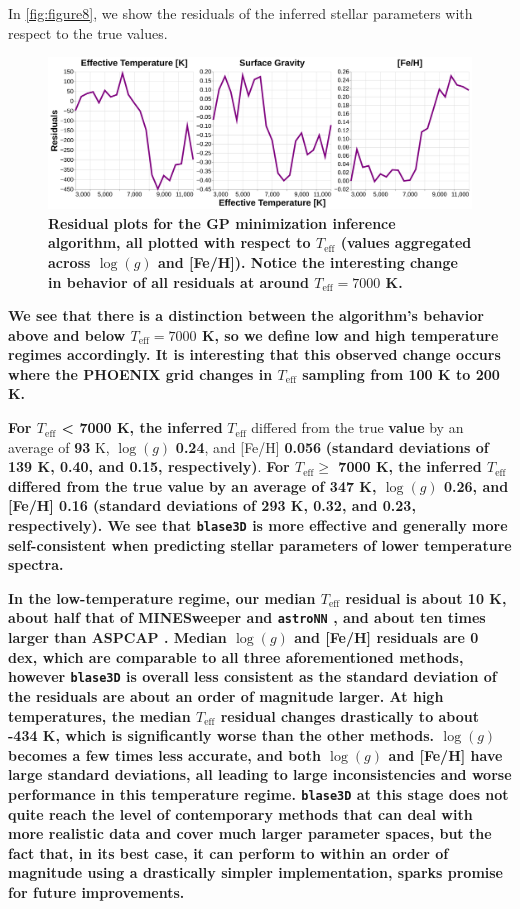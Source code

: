 \documentclass[twocolumn, linenumbers]{aastex631}
\begin{document}
In \autoref{fig:figure8}, we show the residuals of the inferred stellar parameters with respect to the true values.
\begin{figure}
    \centering
    \includegraphics[width=\textwidth]{figure8}
    \caption{\textbf{Residual plots for the GP minimization inference algorithm, all plotted with respect to $T_\text{eff}$ (values aggregated across $\log(g)$ and [Fe/H]).
    Notice the interesting change in behavior of all residuals at around $T_\text{eff} = 7000$ K.}}
    \label{fig:figure8}
\end{figure}
\textbf{We see that there is a distinction between the algorithm's behavior above and below $T_{\mathrm{eff}} = 7000$ K, so we define low and high temperature regimes accordingly.
It is interesting that this observed change occurs where the PHOENIX grid changes in $T_\text{eff}$ sampling from 100 K to 200 K.}

\textbf{For $T_{\mathrm{eff}}$ < 7000 K, the inferred} $T_{\mathrm{eff}}$ differed from the true \textbf{value} by an average of \textbf{93} K, $\log(g)$ \textbf{0.24}, and [Fe/H] \textbf{0.056} \textbf{(standard deviations of 139 K, 0.40, and 0.15, respectively)}.
\textbf{For $T_{\mathrm{eff}} \ge$ 7000 K, the inferred $T_{\mathrm{eff}}$ differed from the true value by an average of 347 K, $\log(g)$ 0.26, and [Fe/H] 0.16 (standard deviations of 293 K, 0.32, and 0.23, respectively).
We see that \texttt{blase3D} is more effective and generally more self-consistent when predicting stellar parameters of lower temperature spectra.}

\textbf{In the low-temperature regime, our median $T_\text{eff}$ residual is about 10 K, about half that of MINESweeper \citep{minesweeper} and \texttt{astroNN} \citep{leung2019}, and about ten times larger than ASPCAP \citep{ASPCAP}.
Median $\log(g)$ and [Fe/H] residuals are 0 dex, which are comparable to all three aforementioned methods, however \texttt{blase3D} is overall less consistent as the standard deviation of the residuals are about an order of magnitude larger.
At high temperatures, the median $T_\text{eff}$ residual changes drastically to about -434 K, which is significantly worse than the other methods.
$\log(g)$ becomes a few times less accurate, and both $\log(g)$ and [Fe/H] have large standard deviations, all leading to large inconsistencies and worse performance in this temperature regime.
\texttt{blase3D} at this stage does not quite reach the level of contemporary methods that can deal with more realistic data and cover much larger parameter spaces, but the fact that, in its best case, it can perform to within an order of magnitude using a drastically simpler implementation, sparks promise for future improvements.}
\end{document}
